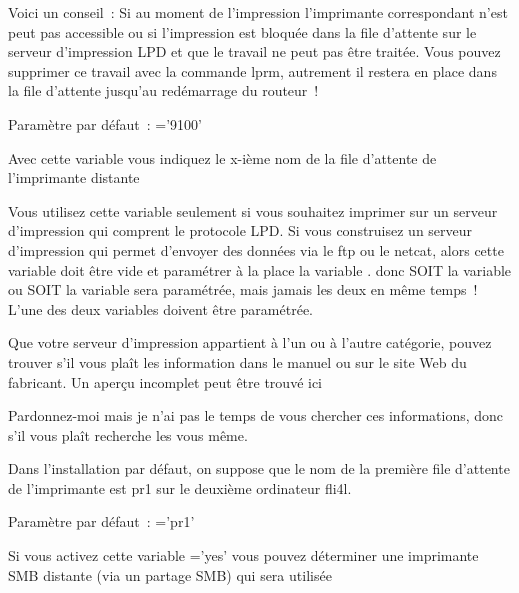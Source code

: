 \begin{description}
    Voici un conseil~:
    Si au moment de l'impression l'imprimante correspondant n'est peut pas
    accessible ou si l'impression est bloquée dans la file d'attente sur le
    serveur d'impression LPD et que le travail ne peut pas être traitée. Vous
    pouvez supprimer ce travail avec la commande lprm, autrement il restera en
    place dans la file d'attente jusqu'au redémarrage du routeur~!

    Paramètre par défaut~: ='9100'



    Avec cette variable  vous indiquez le
    x-ième nom de la file d'attente de l'imprimante distante

    Vous utilisez cette variable seulement si vous souhaitez imprimer sur un
    serveur d'impression qui comprent le protocole LPD.
    Si vous construisez un serveur d'impression qui permet d'envoyer des données
    via le ftp ou le netcat, alors cette variable doit être vide et paramétrer à la
    place la variable . donc
    SOIT la variable  ou SOIT la variable
     sera paramétrée,
    mais jamais les deux en même temps~! L'une des deux variables doivent être
    paramétrée.

    Que votre serveur d'impression appartient à l'un ou à l'autre catégorie,
    pouvez trouver s'il vous plaît les information dans le manuel ou sur le site
    Web du fabricant. Un aperçu incomplet peut être trouvé ici


    Pardonnez-moi mais je n'ai pas le temps de vous chercher ces informations,
    donc s'il vous plaît recherche les vous même.

    Dans l'installation par défaut, on suppose que le nom de la première file
    d'attente de l'imprimante est pr1 sur le deuxième ordinateur fli4l.

    Paramètre par défaut~: ='pr1'



    Si vous activez cette variable ='yes' vous pouvez
    déterminer une imprimante SMB distante (via un partage SMB) qui sera utilisée


\end{description}
